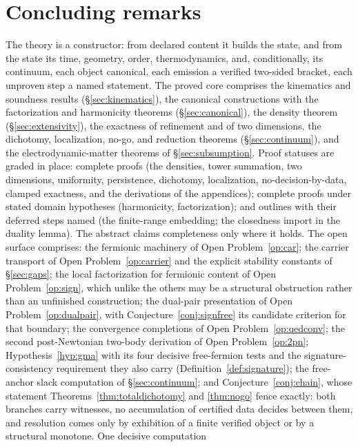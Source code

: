 \documentclass[11pt]{article}
\theoremstyle{definition}
\theoremstyle{remark}
\begin{document}
\section{Concluding remarks}\label{sec:conclusion}

The theory is a constructor: from declared content it builds the state,
and from the state its time, geometry, order, thermodynamics, and,
conditionally, its continuum, each object canonical, each emission a
verified two-sided bracket, each unproven step a named statement.  The
proved core comprises the kinematics and soundness results
(\S\ref{sec:kinematics}), the canonical constructions with the
factorization and harmonicity theorems (\S\ref{sec:canonical}), the
density theorem (\S\ref{sec:extensivity}), the exactness of refinement
and of two dimensions, the dichotomy, localization, no-go, and reduction
theorems (\S\ref{sec:continuum}), and the electrodynamic-matter
theorems of \S\ref{sec:subsumption}.  Proof statuses are graded in
place: complete proofs (the densities, tower summation, two dimensions,
uniformity, persistence, dichotomy, localization, no-decision-by-data,
clamped exactness, and the derivations of the appendices); complete
proofs under stated domain hypotheses (harmonicity, factorization);
and outlines with their deferred steps named (the finite-range
embedding; the closedness import in the duality lemma).  The abstract
claims completeness only where it holds.  The open surface comprises:
the fermionic machinery of
Open Problem~\ref{op:car}; the carrier transport of Open
Problem~\ref{op:carrier} and the explicit stability constants of
\S\ref{sec:gaps}; the local factorization for fermionic content of Open
Problem~\ref{op:sign}, which unlike the others may be a structural
obstruction rather than an unfinished construction; the dual-pair
presentation of Open Problem~\ref{op:dualpair}, with
Conjecture~\ref{conj:signfree} its candidate criterion for that
boundary; the convergence
completions of Open
Problem~\ref{op:qedconv}; the second post-Newtonian two-body derivation
of Open Problem~\ref{op:2pn}; Hypothesis~\ref{hyp:gma} with its four
decisive
free-fermion tests and the signature-consistency requirement they also
carry (Definition~\ref{def:signature}); the free-anchor slack computation of
\S\ref{sec:continuum}; and Conjecture~\ref{conj:chain}, whose statement
Theorems~\ref{thm:totaldichotomy} and \ref{thm:nogo} fence exactly: both
branches carry witnesses, no accumulation of certified data decides
between them, and resolution comes only by exhibition of a finite
verified object or by a structural monotone.  One decisive computation
\end{document}

